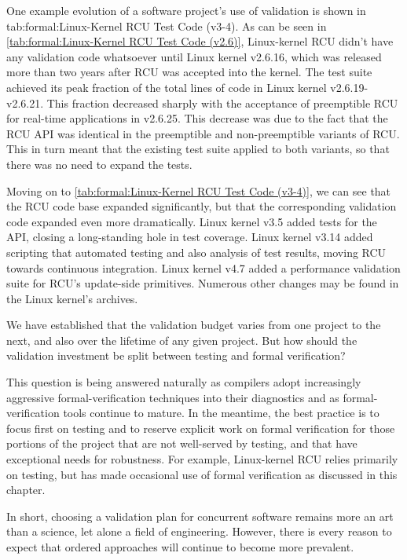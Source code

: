 One example evolution of a software project's use of validation is
shown in
{tab:formal:Linux-Kernel RCU Test Code (v3-4)}.
As can be seen in \cref{tab:formal:Linux-Kernel RCU Test Code (v2.6)},
Linux-kernel RCU didn't have any validation code whatsoever until Linux
kernel v2.6.16, which was released more than two years after RCU was
accepted into the kernel.
The test suite achieved its peak fraction of the total lines of code
in Linux kernel v2.6.19-v2.6.21.
This fraction decreased sharply with the acceptance of preemptible RCU
for real-time applications in v2.6.25.
This decrease was due to the fact that the RCU API was identical
in the preemptible and non-preemptible variants of RCU.
This in turn meant that the existing test suite applied to both variants,
so that there was no need to expand the tests.

Moving on to
\cref{tab:formal:Linux-Kernel RCU Test Code (v3-4)},
we can see that the RCU code base expanded significantly, but that the
corresponding validation code expanded even more dramatically.
Linux kernel v3.5 added tests for the  API, closing
a long-standing hole in test coverage.
Linux kernel v3.14 added scripting that automated testing and also
analysis of test results, moving RCU towards continuous integration.
Linux kernel v4.7 added a performance validation suite for RCU's update-side
primitives.
Numerous other changes may be found in the Linux kernel's  archives.

We have established that the validation budget varies from one project
to the next, and also over the lifetime of any given project.
But how should the validation investment be split between testing and
formal verification?

This question is being answered naturally as compilers adopt increasingly
aggressive formal-verification techniques into their diagnostics and
as formal-verification tools continue to mature.
In the meantime, the best practice is to focus first on testing and to
reserve explicit work on formal verification for those portions of the
project that are not well-served by testing, and that have exceptional
needs for robustness.
For example, Linux-kernel RCU relies primarily on testing, but has
made occasional use of formal verification as discussed in this chapter.

In short, choosing a validation plan for concurrent software remains
more an art than a science, let alone a field of engineering.
However, there is every reason to expect that ordered approaches
will continue to become more prevalent.
